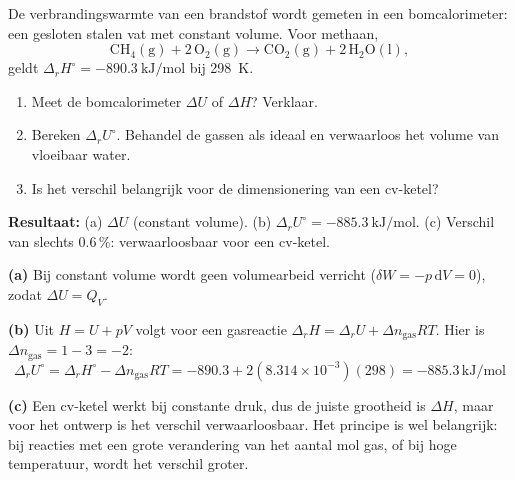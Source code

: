 \begin{oefening}
De verbrandingswarmte van een brandstof wordt gemeten in een bomcalorimeter: een gesloten stalen vat met constant volume. Voor methaan,
\[
\mathrm{CH_4(g) + 2\,O_2(g) \rightarrow CO_2(g) + 2\,H_2O(l)},
\]
geldt $\Delta_r H^\circ = \SI{-890.3}{\kilo\joule\per\mole}$ bij \SI{298}{\kelvin}.
\begin{enumerate}
\item[(a)] Meet de bomcalorimeter $\Delta U$ of $\Delta H$? Verklaar.
\item[(b)] Bereken $\Delta_r U^\circ$. Behandel de gassen als ideaal en verwaarloos het volume van vloeibaar water.
\item[(c)] Is het verschil belangrijk voor de dimensionering van een cv-ketel?
\end{enumerate}
\end{oefening}
\begin{oplossing}
\textbf{Resultaat:} (a) $\Delta U$ (constant volume). (b) $\Delta_r U^\circ = \SI{-885.3}{\kilo\joule\per\mole}$. (c) Verschil van slechts 0.6\,\%: verwaarloosbaar voor een cv-ketel.

\textbf{(a)} Bij constant volume wordt geen volumearbeid verricht ($\delta W = -p\,\mathrm{d}V = 0$), zodat $\Delta U = Q_V$.

\textbf{(b)} Uit $H = U + pV$ volgt voor een gasreactie $\Delta_r H = \Delta_r U + \Delta n_{\text{gas}} RT$. Hier is $\Delta n_{\text{gas}} = 1 - 3 = -2$:
\[
\Delta_r U^\circ = \Delta_r H^\circ - \Delta n_{\text{gas}}RT = -890.3 + 2(8.314\times10^{-3})(298) = -885.3\,\mathrm{kJ/mol}
\]

\textbf{(c)} Een cv-ketel werkt bij constante druk, dus de juiste grootheid is $\Delta H$, maar voor het ontwerp is het verschil verwaarloosbaar. Het principe is wel belangrijk: bij reacties met een grote verandering van het aantal mol gas, of bij hoge temperatuur, wordt het verschil groter.
\end{oplossing}

